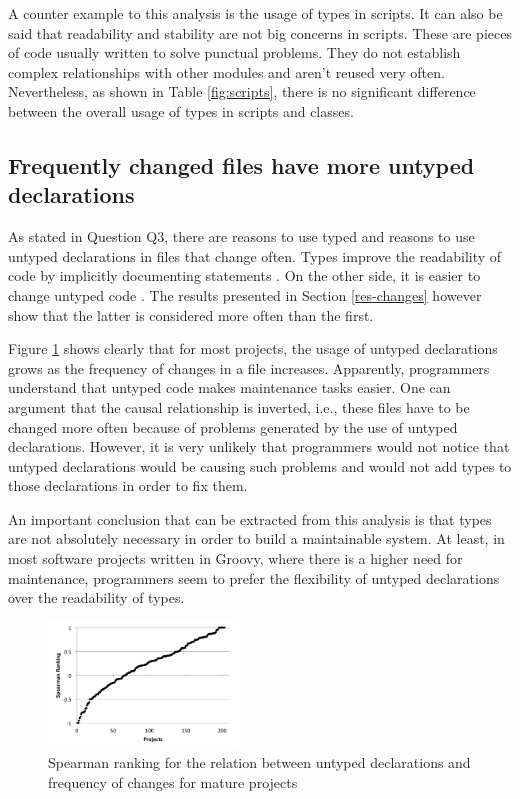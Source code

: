 \documentclass[preprint]{sigplanconf}
\begin{document}
A counter example to this analysis is the usage of types in scripts.
It can also be said that readability and stability are not big concerns in scripts.
These are pieces of code usually written to solve punctual problems.
They do not establish complex relationships with other modules and aren't reused very often.
Nevertheless, as shown in Table \ref{fig:scripts}, there is no significant difference between the overall usage of types in scripts and classes.

\subsection{Frequently changed files have more untyped declarations\label{discussion-q3}}
As stated in Question Q3, there are reasons to use typed and reasons to use untyped declarations in files that change often.
Types improve the readability of code by implicitly documenting statements \cite{should_your_specification_language_be_typed}.
On the other side, it is easier to change untyped code \cite{gradual_typing}.
The results presented in Section \ref{res-changes} however show that the latter is considered more often than the first.

Figure \ref{fig:change_spearman} shows clearly that for most projects, the usage of untyped declarations grows as the frequency of changes in a file increases.
Apparently, programmers understand that untyped code makes maintenance tasks easier.
One can argument that the causal relationship is inverted, i.e., these files have to be changed more often because of problems generated by the use of untyped declarations.
However, it is very unlikely that programmers would not notice that untyped declarations would be causing such problems and would not add types to those declarations in order to fix them.

An important conclusion that can be extracted from this analysis is that types are not absolutely necessary in order to build a maintainable system.
At least, in most software projects written in Groovy, where there is a higher need for maintenance, programmers seem to prefer the flexibility of untyped declarations over the readability of types.
\begin{figure}[hb]
\centering \includegraphics[width=0.45\textwidth]{change_spearman} 
\caption{Spearman ranking for the relation between untyped declarations and frequency of changes for mature projects}
\label{fig:change_spearman} 
\end{figure}
\end{document}
